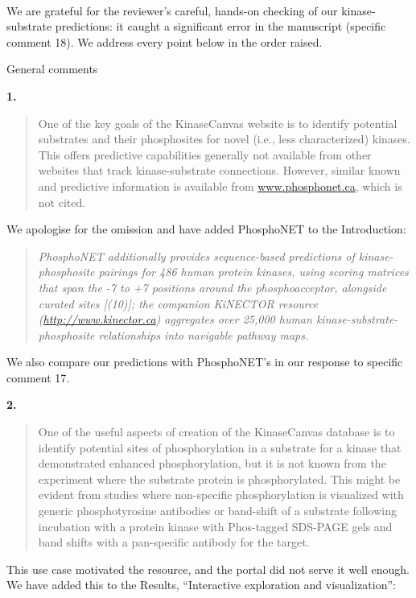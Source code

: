 \documentclass[
]{article}
\begin{document}
~

We are grateful for the reviewer's careful, hands-on checking of our
kinase-substrate predictions: it caught a significant error in the
manuscript (specific comment 18). We address every point below in the
order raised.

General comments

\textbf{1.}

\begin{quote}
One of the key goals of the KinaseCanvas website is to identify
potential substrates and their phosphosites for novel (i.e., less
characterized) kinases. This offers predictive capabilities generally
not available from other websites that track kinase-substrate
connections. However, similar known and predictive information is
available from \href{http://www.phosphonet.ca}{www.phosphonet.ca}, which
is not cited.
\end{quote}

We apologise for the omission and have added PhosphoNET to the
Introduction:

\begin{quote}
\emph{PhosphoNET additionally provides sequence-based predictions of
kinase-phosphosite pairings for 486 human protein kinases, using scoring
matrices that span the -7 to +7 positions around the phosphoacceptor,
alongside curated sites {[}(10){]}; the companion KiNECTOR resource
(\url{http://www.kinector.ca}) aggregates over 25,000 human
kinase-substrate-phosphosite relationships into navigable pathway maps.}
\end{quote}

We also compare our predictions with PhosphoNET's in our response to
specific comment 17.

\textbf{2.}

\begin{quote}
One of the useful aspects of creation of the KinaseCanvas database is to
identify potential sites of phosphorylation in a substrate for a kinase
that demonstrated enhanced phosphorylation, but it is not known from the
experiment where the substrate protein is phosphorylated. This might be
evident from studies where non-specific phosphorylation is visualized
with generic phosphotyrosine antibodies or band-shift of a substrate
following incubation with a protein kinase with Phos-tagged SDS-PAGE
gels and band shifts with a pan-specific antibody for the target.
\end{quote}

This use case motivated the resource, and the portal did not serve it
well enough. We have added this to the Results, ``Interactive
exploration and visualization'':
\end{document}

